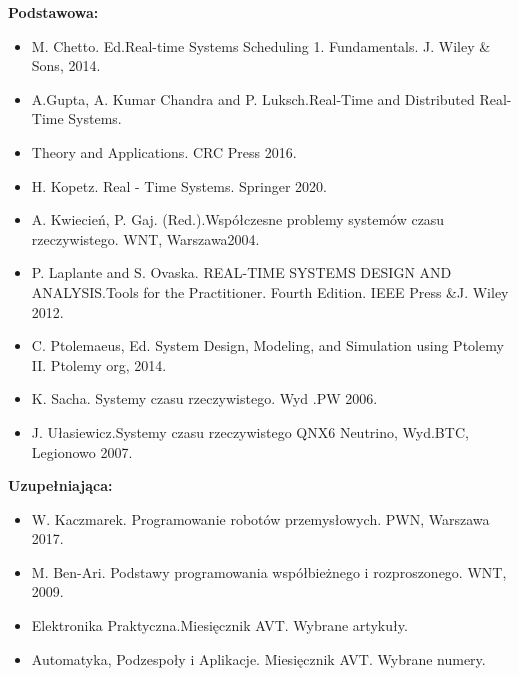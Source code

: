 \documentclass[12pt, a4paper]{article}
\begin{document}
\textbf{Podstawowa:}
\begin{itemize}
  \item M. Chetto. Ed.Real-time Systems Scheduling 1. Fundamentals. J. Wiley \& Sons, 2014.
  \item A.Gupta, A. Kumar Chandra and P. Luksch.Real-Time and Distributed Real-Time Systems.
  \item Theory and Applications. CRC Press 2016.
  \item H. Kopetz. Real - Time Systems. Springer 2020.
  \item A. Kwiecień, P. Gaj. (Red.).Współczesne problemy systemów czasu rzeczywistego. WNT, Warszawa2004.
  \item P. Laplante and S. Ovaska. REAL-TIME SYSTEMS DESIGN AND ANALYSIS.Tools for the Practitioner. Fourth Edition. IEEE Press \&J. Wiley 2012.
  \item C. Ptolemaeus, Ed. System Design, Modeling, and Simulation using Ptolemy II. Ptolemy org, 2014.
  \item K. Sacha. Systemy czasu rzeczywistego. Wyd .PW  2006.
  \item J. Ułasiewicz.Systemy czasu rzeczywistego QNX6 Neutrino, Wyd.BTC, Legionowo 2007.
\end{itemize}

\textbf{Uzupełniająca:}
\begin{itemize}
  \item W. Kaczmarek. Programowanie robotów przemysłowych. PWN, Warszawa 2017.
  \item M. Ben-Ari. Podstawy programowania współbieżnego i rozproszonego. WNT, 2009.
  \item Elektronika Praktyczna.Miesięcznik AVT. Wybrane artykuły.
  \item Automatyka, Podzespoły i Aplikacje. Miesięcznik AVT. Wybrane numery.
\end{itemize}
\end{document}
